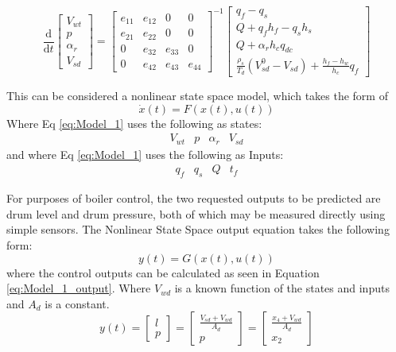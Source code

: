     \begin{equation}
        \label{eq:Model_1}
        \frac{\mathrm{d} }{\mathrm{d} t} \left [ \begin{matrix} V_{wt}\\ p\\ \alpha_r\\ V_{sd}\end{matrix} \right ] =
        \left [ \begin{matrix}e_{11}& e_{12}& 0& 0 \\ e_{21}& e_{22}& 0& 0 \\ 0 & e_{32}& e_{33}& 0 \\ 0 & e_{42}& e_{43}& e_{44}\end{matrix} \right ] ^{-1} \left [ \begin{matrix} q_f  - q_s \\ Q + q_f h_f  - q_s h_s\\ Q + \alpha_r h_c q_{dc} \\ \frac{\rho_s}{T_d}  \left ( V_{sd}^0  - V_{sd}\right ) + \frac{h_f - h_w}{h_c}q_f \end{matrix} \right ]
    \end{equation}
    
    This can be considered a nonlinear state space model, which takes the form of 
    $$\dot{x}(t) = F\left ( x(t),u(t) \right )$$
    Where Eq \ref{eq:Model_1} uses the following as states:
    $$ \begin{matrix} V_{wt} & p& \alpha_r& V_{sd}\end{matrix} $$
    and where Eq \ref{eq:Model_1} uses the following as Inputs:
    $$ \begin{matrix} q_f & q_s & Q & t_f\end{matrix} $$
    
    For purposes of boiler control, the two requested outputs to be predicted are drum level and drum pressure, both of which may be measured directly using simple sensors. The Nonlinear State Space output equation takes the following form: 
    $$y(t) = G\left ( x(t),u(t) \right )$$
    where the control outputs can be calculated as seen in Equation \ref{eq:Model_1_output}. Where $V_{wd}$ is a known function of the states and inputs and $A_d$ is a constant. 
    \begin{equation}
        \label{eq:Model_1_output}
        y(t) = \left [ \begin{matrix} l\\ p \end{matrix} \right ] = \left [ \begin{matrix} \frac{V_{sd} + V_{wd}}{A_d}\\ p \end{matrix} \right ]= \left [ \begin{matrix} \frac{x_4 + V_{wd}}{A_d}\\ x_2 \end{matrix} \right ]
    \end{equation}
    
